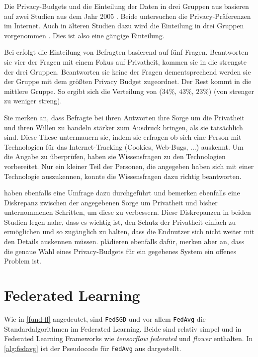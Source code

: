 Die Privacy-Budgets und die Einteilung der Daten in drei Gruppen aus \textcite{boenisch:2023} basieren auf zwei Studien aus dem Jahr 2005 \cite{jensen:2005, acquisti:2005}. Beide untersuchen die Privacy-Präferenzen im Internet. Auch in älteren Studien dazu wird die Einteilung in drei Gruppen vorgenommen \cite{westin:1998}. Dies ist also eine gängige Einteilung.

Bei \textcite{jensen:2005} erfolgt die Einteilung von Befragten basierend auf fünf Fragen. Beantworten sie vier der Fragen mit einem Fokus auf Privatheit, kommen sie in die strengste der drei Gruppen. Beantworten sie keine der Fragen dementsprechend werden sie der Gruppe mit dem größten Privacy Budget zugeordnet. Der Rest kommt in die mittlere Gruppe. So ergibt sich die Verteilung von ($34\%$, $43\%$, $23\%$) (von strenger zu weniger streng). 

Sie merken an, dass Befragte bei ihren Antworten ihre Sorge um die Privatheit und ihren Willen zu handeln stärker zum Ausdruck bringen, als sie tatsächlich sind. Diese These untermauern sie, indem sie erfragen ob sich eine Person mit Technologien für das Internet-Tracking (Cookies, Web-Bugs, ...) auskennt. Um die Angabe zu überprüfen, haben sie Wissensfragen zu den Technologien vorbereitet. Nur ein kleiner Teil der Personen, die angegeben haben sich mit einer Technologie auszukennen, konnte die Wissensfragen dazu richtig beantworten.

\textcite{acquisti:2005} haben ebenfalls eine Umfrage dazu durchgeführt und bemerken ebenfalls eine Diskrepanz zwischen der angegebenen Sorge um Privatheit und bisher unternommenen Schritten, um diese zu verbessern. Diese Diskrepanzen in beiden Studien legen nahe, dass es wichtig ist, den Schutz der Privatheit einfach zu ermöglichen und so zugänglich zu halten, dass die Endnutzer sich nicht weiter mit den Details auskennen müssen. \textcite{jorgensen:2015} plädieren ebenfalls dafür, merken aber an, dass die genaue Wahl eines Privacy-Budgets für ein gegebenes System ein offenes Problem ist.

\section{Federated Learning}\label{sec:rw-fl}

Wie in \autoref{fund-fl} angedeutet, sind \texttt{FedSGD} und vor allem \texttt{FedAvg} die Standardalgorithmen im Federated Learning. Beide sind relativ simpel und in Federated Learning Frameworks wie \textit{tensorflow federated} und \textit{flower} enthalten. In \autoref{alg:fedavg} ist der Pseudocode für \texttt{FedAvg} aus \cite{mcmahan:2016} dargestellt. 


